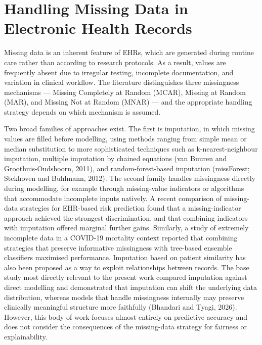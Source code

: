\documentclass[12pt,a4paper]{report}
\begin{document}
\section{Handling Missing Data in Electronic Health Records}
Missing data is an inherent feature of EHRs, which are generated during routine care rather than according to research protocols. As a result, values are frequently absent due to irregular testing, incomplete documentation, and variation in clinical workflow. The literature distinguishes three missingness mechanisms --- Missing Completely at Random (MCAR), Missing at Random (MAR), and Missing Not at Random (MNAR) --- and the appropriate handling strategy depends on which mechanism is assumed.

Two broad families of approaches exist. The first is imputation, in which missing values are filled before modelling, using methods ranging from simple mean or median substitution to more sophisticated techniques such as k-nearest-neighbour imputation, multiple imputation by chained equations (van Buuren and Groothuis-Oudshoorn, 2011), and random-forest-based imputation (missForest; Stekhoven and Buhlmann, 2012). The second family handles missingness directly during modelling, for example through missing-value indicators or algorithms that accommodate incomplete inputs natively. A recent comparison of missing-data strategies for EHR-based risk prediction found that a missing-indicator approach achieved the strongest discrimination, and that combining indicators with imputation offered marginal further gains. Similarly, a study of extremely incomplete data in a COVID-19 mortality context reported that combining strategies that preserve informative missingness with tree-based ensemble classifiers maximised performance. Imputation based on patient similarity has also been proposed as a way to exploit relationships between records. The base study most directly relevant to the present work compared imputation against direct modelling and demonstrated that imputation can shift the underlying data distribution, whereas models that handle missingness internally may preserve clinically meaningful structure more faithfully (Bhandari and Tyagi, 2026). However, this body of work focuses almost entirely on predictive accuracy and does not consider the consequences of the missing-data strategy for fairness or explainability.
\end{document}
